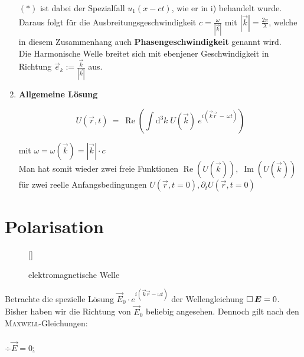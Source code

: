 \begin{enumerate}
$(*)$ ist dabei der Spezialfall $u_1(x-ct)$, wie er in i) behandelt wurde.\\
Daraus folgt für die Ausbreitungsgeschwindigkeit $c =\frac{\omega}{|\vec{k}|}$ mit $|\vec{k}|=\frac{2\pi}{\lambda}$, welche in diesem Zusammenhang auch \textbf{Phasengeschwindigkeit} genannt wird.\\
Die Harmonische Welle breitet sich mit ebenjener Geschwindigkeit in Richtung $\vec{e}_k := \frac{\vec{k}}{|\vec{k}|}$ aus.

\item \textbf{Allgemeine Lösung}

\begin{equation*}
U(\vec{r},t) \ = \ \operatorname{Re} \left(\int\mathrm{d}^3 k \; U(\vec{k}) \ e^{i(\vec{k}\vec{r} \ - \ \omega t)}\right)
\end{equation*}

mit $\omega = \omega(\vec{k}) = |\vec{k}| \cdot c$\\
Man hat somit wieder zwei freie Funktionen $\operatorname{Re}(U(\vec{k})),\; \operatorname{Im}(U(\vec{k}))$ für zwei reelle Anfangsbedingungen $U(\vec{r},t=0), \partial_t U(\vec{r},t=0)$

\end{enumerate}


\section{Polarisation}
\begin{wrapfigure}[]{r}[0cm]{0cm}
	\raisebox{0pt}[\dimexpr{}\baselineskip\relax]{
		\colorbox{hgrey}{
		}
	}
	\caption{elektromagnetische Welle}
\end{wrapfigure}
Betrachte die spezielle Lösung $\vec{E}_0 \cdot e^{i(\vec{k}\vec{r} - \omega t)}$ der Wellengleichung $\mathop{{}\Box}\nolimits \bm{E} = 0$. Bisher haben wir die Richtung von $\vec{E}_0$ beliebig angesehen. Dennoch gilt nach den \textsc{Maxwell}-Gleichungen:\
\\
\ \\ \linebreak\linebreak\linebreak\linebreak
\underline{$\div\vec{E} = 0$:}

